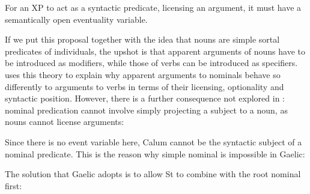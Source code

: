 \documentclass[output=paper]{langsci/langscibook}
\begin{document}
\ea For an XP to act as a syntactic predicate, licensing an argument, it must
have a semantically open eventuality variable. \z

If we put this proposal together with the idea that nouns are simple sortal
predicates of individuals, the upshot is that apparent arguments of nouns have
to be introduced as modifiers, while those of verbs can be introduced as
specifiers. \textcite{adgerbook} uses this theory to explain why apparent
arguments to nominals behave so differently to arguments to verbs in terms of
their licensing, optionality and syntactic position. However, there is a
further consequence not explored in \citet{adgerbook}: nominal predication
cannot involve simply projecting a subject to a noun, as nouns cannot license
arguments:

\ea
{}
\z

Since there is no event variable here, Calum cannot be the syntactic subject of a nominal predicate. This is the reason why simple nominal  is impossible in Gaelic:

\ea {}
\z

The solution that Gaelic adopts is to allow St to combine with the root nominal
first:
\end{document}
